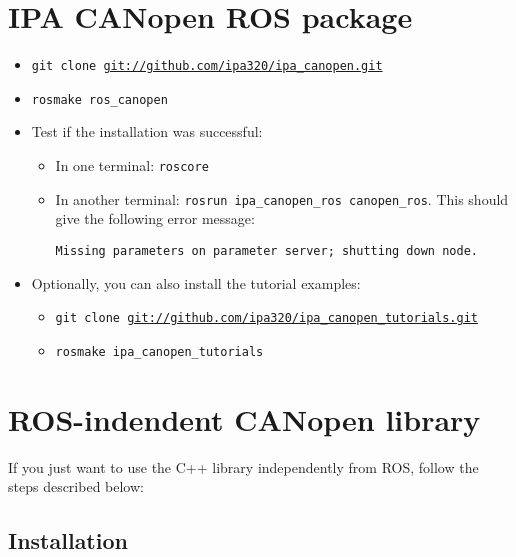   \section{IPA CANopen ROS package}
\label{chap:installation:ipa_canopen_ros}

  \begin{itemize}
  \item \texttt{git clone \url{git://github.com/ipa320/ipa_canopen.git}}
  \item \texttt{rosmake ros\_canopen} 
  \item Test if the installation was successful:
    \begin{itemize}
    \item In one terminal: \texttt{roscore}
    \item In another terminal: \texttt{rosrun ipa\_canopen\_ros canopen\_ros}. This should give the following error message:
      {\scriptsize
\begin{verbatim}Missing parameters on parameter server; shutting down node.\end{verbatim}}
\end{itemize}
\item Optionally, you can also install the tutorial examples:
\begin{itemize}
\item \texttt{git clone \url{git://github.com/ipa320/ipa_canopen_tutorials.git}}
\item \texttt{rosmake ipa\_canopen\_tutorials}
\end{itemize}

\end{itemize}


 \section{ROS-indendent CANopen library}
\label{chap:installation:ipa_canopen_core}

If you just want to use the C++ library independently from ROS, follow the steps described below:

\subsection{Installation}

